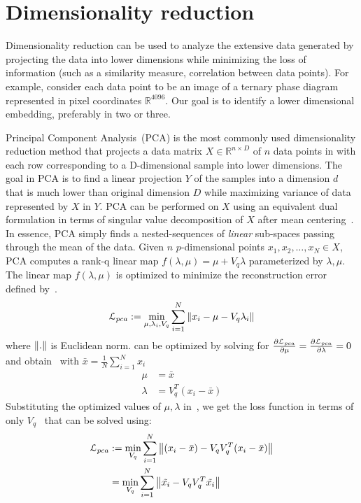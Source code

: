 \section{Dimensionality reduction}
Dimensionality reduction can be used to analyze the extensive data generated by projecting the data into lower dimensions while minimizing the loss of information (such as a similarity measure, correlation between data points). 
For example, consider each data point to be an image of a ternary phase diagram represented in pixel coordinates \(\mathbb{R}^{4096}\). 
Our goal is to identify a lower dimensional embedding, preferably in two or three.

Principal Component Analysis~(PCA) is the most commonly used dimensionality reduction method that projects a data matrix \(X\in \mathbb{R}^{n \times D}\) of \(n\) data points in  with each row corresponding to a D-dimensional sample into lower dimensions. 
The goal in PCA is to find a linear projection \(Y\) of the samples into a dimension \(d\) that is much lower than original dimension \(D\) while maximizing variance of data represented by \(X\) in \(Y\). 
PCA can be performed on \(X\) using an equivalent dual formulation in terms of singular value decomposition of \(X\) after mean centering~\cite{ESL}. 
In essence, PCA simply finds a nested-sequences of \textit{linear} sub-spaces passing through the mean of the data.
Given \(n\) \(p\)-dimensional points \(x_1,x_2,\dots,x_N \in X\), PCA computes a rank-q linear map \(f(\lambda, \mu) = \mu + V_q\lambda\) parameterized by \(\lambda, \mu\). 
The linear map \(f(\lambda, \mu)\) is optimized to minimize the reconstruction error defined by~.
\begin{align}\label{eq:pcaloss}
    \mathcal{L}_{pca}:=\min_{\mu, {\lambda_i}, V_q} \sum_{i=1}^{N} \left\lVert x_i - \mu -V_q\lambda_i\right\rVert
\end{align}
where \(\left\lVert.\right\rVert\) is Euclidean norm. 
 can be optimized by solving for \(\pdv{\mathcal{L}_{pca}}{\mu}=\pdv{\mathcal{L}_{pca}}{\lambda}=0\) and obtain~ with \(\bar{x} =\frac{1}{N} \sum_{i=1}^{N} x_i \)
\begin{align}
    \mu &= \bar{x} \nonumber \\
    \lambda &= V_{q}^{T}(x_i - \bar{x}) \label{eq:pcaoptims}
\end{align}
Substituting the optimized values of \(\mu, \lambda\) in~, we get the loss function in terms of only \(V_q\)~ that can be solved using:
\begin{align}
    \mathcal{L}_{pca}&:=\min_{V_q} \sum_{i=1}^{N}\left\lVert(x_i - \bar{x}) - V_{q}V_{q}^{T}(x_i - \bar{x})\right\rVert \nonumber \\
    &=\min_{V_q} \sum_{i=1}^{N}\left\lVert\Tilde{x_i} - V_{q}V_{q}^{T}\Tilde{x_i}\right\rVert \label{eq:pcaeigprob}
\end{align}

